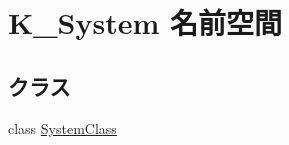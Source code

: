 \hypertarget{namespace_k___system}{}\section{K\+\_\+\+System 名前空間}
\label{namespace_k___system}
\subsection*{クラス}
\begin{DoxyCompactItemize}
\item 
class \mbox{\hyperlink{class_k___system_1_1_system_class}{System\+Class}}
\end{DoxyCompactItemize}

